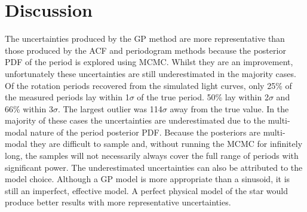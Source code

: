 \documentclass[useAMS, usenatbib, preprint, 12pt]{aastex}
\begin{document}
\section{Discussion}
\label{sec:discussion}

The uncertainties produced by the GP method are more representative than those
produced by the ACF and periodogram methods because the posterior PDF of the
period is explored using MCMC.
Whilst they are an improvement, unfortunately these uncertainties are still
underestimated in the majority cases.
Of the rotation periods recovered from the simulated light curves, only 25\%
of the measured periods lay within 1$\sigma$ of the true period.
50\% lay within 2$\sigma$ and 66\% within 3$\sigma$.
The largest outlier was 114$\sigma$ away from the true value.
In the majority of these cases the uncertainties are underestimated due to the
multi-modal nature of the period posterior PDF.
Because the posteriors are multi-modal they are difficult to sample and,
without running the MCMC for infinitely long, the samples will not necessarily
always cover the full range of periods with significant power.
The underestimated uncertainties can also be attributed to the model choice.
Although a GP model is more appropriate than a sinusoid, it is still an
imperfect, effective model.
A perfect physical model of the star would produce better results with more
representative uncertainties.
\end{document}
